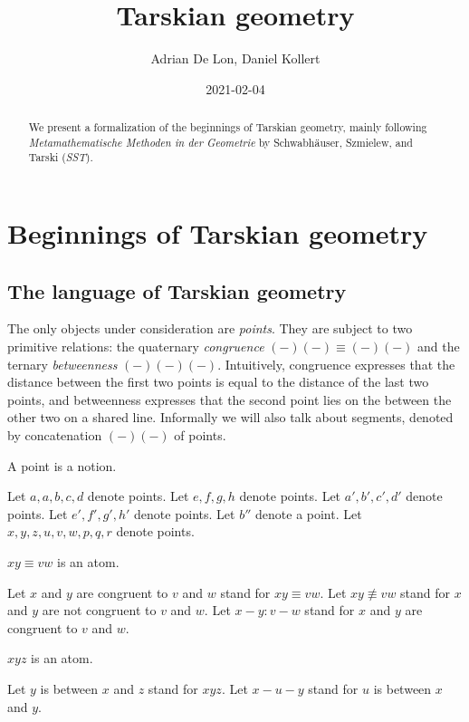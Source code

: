 \documentclass[10pt,a4paper,parskip=half,numbers=endperiod,headings=standardclasses,parskip]{scrartcl}
\title{Tarskian geometry}
\author{Adrian De Lon, Daniel Kollert}
\date{2021-02-04}
\newcommand{\Cong}[4]{#1 #2 \equiv #3 #4}
\newcommand{\NotCong}[4]{#1 #2 \not\equiv #3 #4}
\newcommand{\Betw}[3]{#1 #2 #3}
\newcommand{\vara}{a}
\newcommand{\aprime}{a'}
\newcommand{\bprime}{b'}
\newcommand{\cprime}{c'}
\def\dprime{d'}
\newcommand{\eprime}{e'}
\newcommand{\fprime}{f'}
\newcommand{\gprime}{g'}
\newcommand{\hprime}{h'}
\newcommand{\bdoubleprime}{b''}
\begin{document}
  \maketitle

  \begin{abstract}
    We present a formalization of the beginnings of Tarskian geometry,
    mainly following %
    \textit{Metamathematische Methoden in der Geometrie}
    by Schwabhäuser, Szmielew, and Tarski (\textit{SST}).
  \end{abstract}


  \tableofcontents

  \section{Beginnings of Tarskian geometry}

  \subsection{The language of Tarskian geometry}

  The only objects under consideration are \textit{points}.
  They are subject to two primitive relations:
  the quaternary \textit{congruence} $\Cong{(-)}{(-)}{(-)}{(-)}$
  and the ternary \textit{betweenness} $\Betw{(-)}{(-)}{(-)}$.
  Intuitively, congruence expresses that the distance between the first two points is equal to the distance of the last two points, and betweenness expresses that
  the second point lies on the between the other two on a shared line.
  Informally we will also talk about segments, denoted by concatenation $(-)(-)$ of points.


  \begin{forthel}

    \begin{signature}
      A point is a notion.
    \end{signature}

    Let $\vara, a, b, c, d$ denote points.
    Let $e, f, g, h$ denote points.
    Let $\aprime, \bprime, \cprime, \dprime$ denote points.
    Let $\eprime, \fprime, \gprime, \hprime$ denote points.
    Let $\bdoubleprime$ denote a point.
    Let $x, y, z, u, v, w, p, q, r$ denote points.


    \begin{signature}
      $\Cong{x}{y}{v}{w}$ is an atom.
    \end{signature}
    Let $x$ and $y$ are congruent to $v$ and $w$ stand for $\Cong{x}{y}{v}{w}$.
    Let $\NotCong{x}{y}{v}{w}$ stand for $x$ and $y$ are not congruent to $v$ and $w$.
    Let $x-y : v-w$ stand for $x$ and $y$ are congruent to $v$ and $w$.

    \begin{signature}
      $\Betw{x}{y}{z}$ is an atom.
    \end{signature}

    Let $y$ is between $x$ and $z$ stand for $\Betw{x}{y}{z}$.
    Let $x-u-y$ stand for $u$ is between $x$ and $y$.
  \end{forthel}
\end{document}
